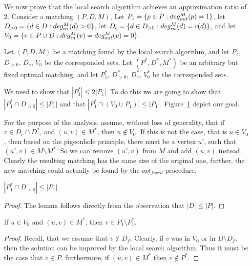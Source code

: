 We now prove that the local search algorithm achieves an approximation ratio of $2$.
Consider a matching $(P, D, M)$,
Let $P_1 = \{p \in P : deg^M_{out}(p) = 1\}$,
let $D_{>0} = \{d \in D : deg^M_{in}(d) > 0\}$,
let $D_c = \{d \in D_{>0} : deg^M_{in}(d) = c(d)\}$,
and let $V_0 = \{v \in P \cup D : deg^M_{in}(v) = deg^M_{out}(v) = 0\}$. 

Let $(P, D, M)$ be a matching found by the local search algorithm, 
and let $P_1$, $D_{>0}$, $D_c$, $V_0$ be the corresponded sets.
Let $(P^*, D^*, M^*)$ be an arbitrary but fixed optimal matching.
and let $P^*_1$, $D^*_{>0}$, $D^*_c$, $V^*_0$ be the corresponded sets.

We need to show that $|P^*_1| \leq 2|P_1|$.
To do this we are going to show that 
$|P^*_1 \cap D_{>0}| \leq |P_1|$ 
and that
$|P^*_1 \cap (V_0 \cup P_1)| \leq |P_1|$.
Figure~\ref{fig:uwcm-illustration} depict our goal.

\begin{figure}
\centering

\caption{
\label{fig:uwcm-illustration}
}
\end{figure}


For the purpose of the analysis, assume, without loss of generality, that
if $v \in D_c \cap D^*$, and $(u, v) \in M^*$, then $u \notin V_0$.
If this is not the case, that is $u \in V_0$, then based on the pigeonhole principle,
there must be a vertex $u'$, such that $(u', v) \in M \setminus M^*$.
So we can remove $(u', v)$ from $M$ and add $(u, v)$ instead.
Clearly the resulting matching has the same size of the original one,
further, the new matching could actually be found by the $opt_{fixed}$ procedure.


\begin{lemma}
\label{lm:dleqp}
$|P^*_1 \cap D_{>0}| \leq |P_1|$
\end{lemma}

\begin{proof}
The lemma follows directly from the observation that 
${|D| \leq |P|}$.
\end{proof}

\begin{lemma}
\label{lm:v_in_p}
If $u \in V_0$ and $(u, v) \in M^*$, then $v \in P_1 \setminus P^*_1$.
\end{lemma}

\begin{proof}
Recall, that we assume that $v \notin D_f$.
Clearly, if $v$ was in $V_0$ or in $D \setminus D_f$, 
then the solution can be improved by the local search algorithm.
Thus it must be the case that $v \in P$, furthermore, 
if $(u, v) \in M^*$ then $v \notin P^*$. 
\end{proof}

